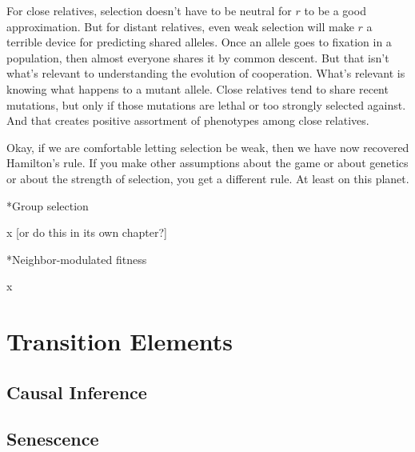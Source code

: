 \documentclass[10pt,reqno]{amsbook}
\makeatletter
\renewcommand\section{\@startsection{section}{1}
\z@{.7\linespacing\@plus\linespacing}{.5\linespacing}
{\large\bfseries\itshape}}
\numberwithin{equation}{chapter}
\makeatother
\begin{document}
For close relatives, selection doesn't have to be neutral for $r$ to be a good approximation. But for distant relatives, even weak selection will make $r$ a terrible device for predicting shared alleles. Once an allele goes to fixation in a population, then almost everyone shares it by common descent. But that isn't what's relevant to understanding the evolution of cooperation. What's relevant is knowing what happens to a mutant allele. Close relatives tend to share recent mutations, but only if those mutations are lethal or too strongly selected against. And that creates positive assortment of phenotypes among close relatives. 

Okay, if we are comfortable letting selection be weak, then we have now recovered Hamilton's rule. If you make other assumptions about the game or about genetics or about the strength of selection, you get a different rule. At least on this planet.

\section*{Group selection}

x [or do this in its own chapter?]

\section*{Neighbor-modulated fitness}

x


\part{Transition Elements}




\setcounter{chapter}{6}
\def \chapterElement {Ki}
\chapter{Causal Inference}


\lipsum[2-4]




\setcounter{chapter}{10}
\def \chapterElement {Se}
\chapter{Senescence}
\end{document}
